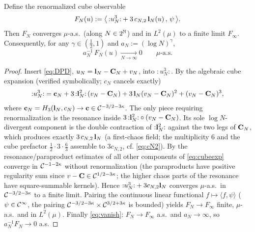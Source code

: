 \begin{qonelemma}\label{lem:cancel}
Define the renormalized cube observable
\begin{equation}\label{eq:FN}
F_N(u):=\bigl\langle\,{:}u_N^3{:}+3\,c_{N,2}\,\mathbf{l}_N(u)\,,\,\psi\,\bigr\rangle .
\end{equation}
Then $F_N$ converges $\mu$-a.s.\ (along $N\in2^{\mathbb{N}}$) and in $L^2(\mu)$ to a finite
limit $F_\infty$. Consequently, for any $\gamma\in(\tfrac12,1)$ and $a_N:=(\log N)^\gamma$,
\begin{equation}\label{eq:vanish}
a_N^{-1}\,F_N(u)\xrightarrow[N\to\infty]{}0\qquad\mu\text{-a.s.}
\end{equation}
\end{qonelemma}
\begin{proof}
Insert \eqref{eq:DPD}, $u_N=\mathbf{l}_N-\mathbf{C}_N+v_N$, into ${:}u_N^3{:}$. By the
algebraic cube expansion (verified symbolically; $c_N$ cancels exactly)
\begin{equation}\label{eq:cubeexp}
{:}u_N^3{:}=\mathbf{c}_N+3\,{:}\mathbf{l}_N^2{:}\,(v_N-\mathbf{C}_N)+3\,\mathbf{l}_N(v_N-\mathbf{C}_N)^2+(v_N-\mathbf{C}_N)^3,
\end{equation}
where $\mathbf{c}_N=H_3(\mathbf{l}_N,c_N)\to\mathbf{c}\in\mathcal{C}^{-3/2-3\kappa}$. The only
piece requiring renormalization is the resonance inside
$3\,{:}\mathbf{l}_N^2{:}\circ(v_N-\mathbf{C}_N)$. Its sole $\log N$-divergent component is
the double contraction of ${:}\mathbf{l}_N^2{:}$ against the two legs of $\mathbf{C}_N$,
which produces exactly $3\,c_{N,2}\,\mathbf{l}_N$ (a first-chaos field; the multiplicity
$6$ and the cube prefactor $\tfrac12\cdot 3\cdot\frac{6}{3}$ assemble to $3c_{N,2}$, cf.
\eqref{eq:cN2}). By the resonance/paraproduct estimates of \cite{CC18,GIP15} all other
components of \eqref{eq:cubeexp} converge in $\mathcal{C}^{-1-2\kappa}$ without
renormalization (the paraproducts have positive regularity sum since
$v-\mathbf{C}\in\mathcal{C}^{1/2-3\kappa}$; the higher chaos parts of the resonance have
square-summable kernels). Hence
${:}u_N^3{:}+3c_{N,2}\mathbf{l}_N$ converges $\mu$-a.s.\ in $\mathcal{C}^{-3/2-3\kappa}$ to a
finite limit. Pairing the continuous linear functional $f\mapsto\langle f,\psi\rangle$
($\psi\in\mathcal{C}^\infty$, the pairing $\mathcal{C}^{-3/2-3\kappa}\times\mathcal{C}^{3/2+3\kappa}$ is
bounded) yields $F_N\to F_\infty$ finite, $\mu$-a.s.\ and in $L^2(\mu)$. Finally
\eqref{eq:vanish}: $F_N\to F_\infty$ a.s.\ and $a_N\to\infty$, so $a_N^{-1}F_N\to0$
a.s.
\end{proof}

